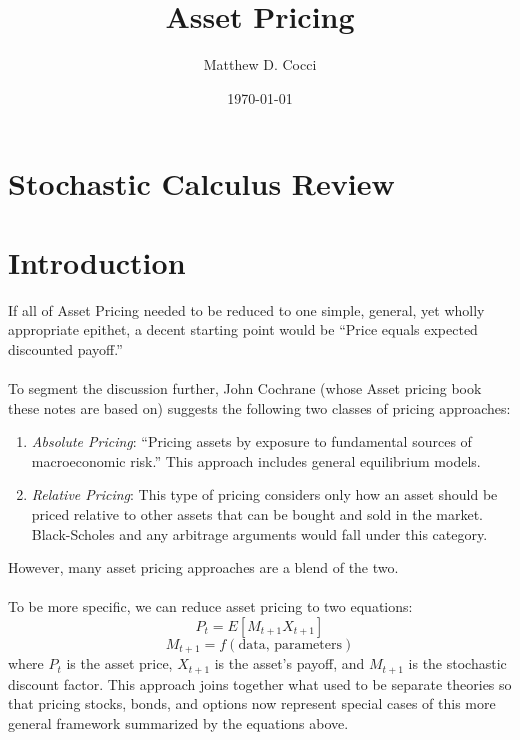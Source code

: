 \documentclass[12pt]{article}
\author{Matthew D. Cocci}
\title{Asset Pricing}
\date{\today}
\theoremstyle{plain}
\theoremstyle{definition}
\theoremstyle{remark}
\begin{document}
\maketitle

\tableofcontents

\newpage
\section{Stochastic Calculus Review}

\newpage
\section{Introduction}

If all of Asset Pricing needed to be reduced to one simple,
general, yet wholly appropriate epithet, a decent starting
point would be ``Price equals expected discounted payoff.''
\\
\\
To segment the discussion further, John Cochrane (whose Asset pricing book
these notes are based on) suggests the following two classes of pricing
approaches:
\begin{enumerate}
    \item {\sl Absolute Pricing}: ``Pricing assets by exposure
	to fundamental sources of macroeconomic risk.'' This
	approach includes general equilibrium models.
    \item {\sl Relative Pricing}: This type of pricing considers
	only how an asset should be priced relative to
	other assets that can be bought and sold in the
	market. Black-Scholes and any arbitrage arguments
	would fall under this category.
\end{enumerate}
However, many asset pricing approaches are a blend of the two.
\\
\\
To be more specific, we can reduce asset pricing to two
equations:
\begin{equation}
    P_t = E[M_{t+1} X_{t+1} ]
\end{equation}
\begin{equation}
    M_{t+1} = f(\text{data, parameters})
\end{equation}
where $P_t$ is the asset price, $X_{t+1}$ is the asset's payoff,
and $M_{t+1}$ is the stochastic discount factor.
This approach joins together what used to be separate theories so
that pricing stocks, bonds, and options now represent special
cases of this more general framework summarized by the equations above.
\end{document}
